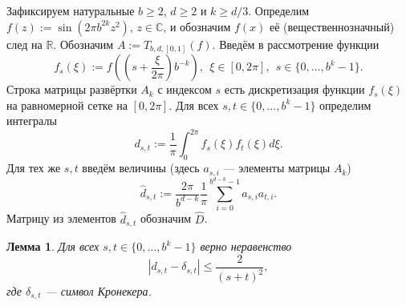 \documentclass[3p]{cmmp}%
\newtheorem{lemma}{Лемма}
\numberwithin{equation}{section}
\begin{document}
Зафиксируем натуральные $b \ge 2$, $d \ge 2$ и $k \ge d/3$. Определим $f(z) := \sin (2\pi b^{2k}z^2)$, $z \in \mathbb{C}$, и обозначим $f(x)$ её (вещественнозначный) след на $\mathbb{R}$.
Обозначим $A := T_{b,d,[0,1]}(f)$.
%
Введём в рассмотрение функции
\[
f_s(\xi) := f\left(\left(s + \frac{\xi}{2\pi}\right) b^{-k}\right),~~\xi \in [0,2\pi],~~s \in \{ 0, \dots, b^k-1\}.
\]
Строка матрицы развёртки $A_k$ с индексом $s$ есть дискретизация функции $f_s(\xi)$ на равномерной сетке на $[0, 2\pi]$.
Для всех $s, t \in \{0, \dots, b^{k}-1\}$ определим интегралы
\[
d_{s,t} := \frac{1}{\pi}\int_{0}^{2\pi}f_s(\xi)f_t(\xi)d\xi.
\]
Для тех же $s,t$ введём величины (здесь $a_{s,i}$ --- элементы матрицы $A_k$)
\begin{equation}\label{eq:d-hat}
\widehat{d}_{s,t} := \frac{2\pi}{b^{d-k}}\frac{1}{\pi}\sum_{i=0}^{b^{d-k}-1}a_{s,i}a_{t,i}.
\end{equation}
Матрицу из элементов $\widehat{d}_{s,t}$ обозначим $\widehat{D}$.
\begin{lemma}\label{lm:d}
	Для всех  $s, t \in \{0, \dots, b^{k}-1\}$ верно неравенство 
	\[
	|d_{s,t} - \delta_{s,t}| \leq \frac{2}{(s+t)^2},
	\]
	где $\delta_{s,t}$ --- символ Кронекера.
\end{lemma}
\end{document}
